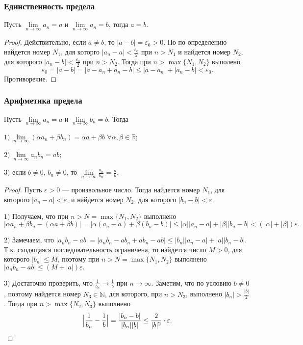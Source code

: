 \documentclass[12pt]{article}
\theoremstyle{definition}
\begin{document}
\subsubsection{Единственность предела}
Пусть $\lim\limits_{n\to\infty}a_n = a$
и $\lim\limits_{n\to\infty}a_n = b$,
тогда $a=b$.

\begin{proof}
Действительно, если $a\ne b$, то $|a-b|=\varepsilon_0>0$.
Но по определению найдется номер $N_1$,
для которго $|a_n-a|<\frac{\varepsilon_0}{2}$ при $n>N_1$
и найдется номер $N_2$, для которого $|a_n-b|<\frac{\varepsilon_0}{2}$
при $n>N_2$.
Тогда при $n>\max\{N_1, N_2\}$ выполено
$$
\varepsilon_0 = |a-b| = |a - a_n + a_n - b|\le |a-a_n| + |a_n-b|<\varepsilon_0.
$$
Противоречие.
\end{proof}
\subsubsection{Арифметика предела}
Пусть $\lim\limits_{n\to\infty}a_n=a$ и $\lim\limits_{n\to\infty}b_n=b$.
Тогда

$1)\ \lim\limits_{n\to\infty}(\alpha a_n + \beta b_n)=\alpha a+ \beta b$
$\forall \alpha,\beta\in \mathbb{R}$;

$2)\ \lim\limits_{n\to\infty}a_nb_n=ab$;

$3)$ если $b\ne0$, $b_n\ne 0$, то $\lim\limits_{n\to \infty}\frac{a_n}{b_n} = \frac{a}{b}$.

\begin{proof}
Пусть $\varepsilon>0$ --- произвольное число.
Тогда найдется номер $N_1$, для которого $|a_n-a|<\varepsilon$,
и найдется номер $N_2$, для которого $|b_n-b|<\varepsilon$.

$1)$ Получаем, что при $n>N=\max\{N_1, N_2\}$
выполнено
$$
|\alpha a_n +\beta b_n - (\alpha a+\beta b)|
=
|\alpha (a_n-a) +\beta (b_n-b)|
\le
|\alpha| |a_n-a| + |\beta| |b_n-b|< (|\alpha| + |\beta|)\varepsilon.
$$

$2)$ Замечаем, что
$|a_nb_n - ab| = |a_nb_n - ab_n + ab_n - ab|\le
|b_n||a_n - a| + |a||b_n - b|.$
Т.к. сходящаяся последовательность ограничена,
то найдется число $M>0$, для которого
$|b_n|\le M$, поэтому
при $n>N=\max\{N_1, N_2\}$
выполнено
$|a_nb_n - ab|\le (M + |a|)\varepsilon.$

$3)$ Достаточно проверить, что $\frac{1}{b_n}\to \frac{1}{b}$ при $n\to\infty$.
Заметим, что по условию $b\ne 0$, поэтому найдется номер $N_3\in \mathbb{N}$,
для которого, при $n>N_3$, выполнено
$|b_n|>\frac{|b|}{2}$.
Тогда при $n>\max\{N_2, N_3\}$ выполнено
$$
\Bigl|\frac{1}{b_n}-\frac{1}{b}\Bigr| = \frac{|b_n-b|}{|b_n||b|}\le \frac{2}{|b|^2}\cdot \varepsilon.
$$
\end{proof}
\end{document}
